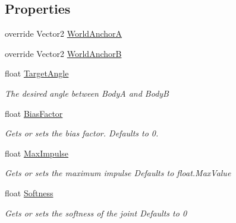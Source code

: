 \subsection*{Properties}
\begin{DoxyCompactItemize}
\item 
override Vector2 \hyperlink{class_farseer_physics_1_1_dynamics_1_1_joints_1_1_angle_joint_a746ea8907dc1b6603ebaa78c293d350b}{World\+Anchor\+A}
\item 
override Vector2 \hyperlink{class_farseer_physics_1_1_dynamics_1_1_joints_1_1_angle_joint_a5b13e62b4d20eee9f5d6e2aebc826d3d}{World\+Anchor\+B}
\item 
float \hyperlink{class_farseer_physics_1_1_dynamics_1_1_joints_1_1_angle_joint_ab71740c25d87b0a1f80804387f7c733d}{Target\+Angle}
\begin{DoxyCompactList}\small\item\em The desired angle between Body\+A and Body\+B \end{DoxyCompactList}\item 
float \hyperlink{class_farseer_physics_1_1_dynamics_1_1_joints_1_1_angle_joint_aa7cc30868103af9703678ad8f9c6eb20}{Bias\+Factor}
\begin{DoxyCompactList}\small\item\em Gets or sets the bias factor. Defaults to 0. \end{DoxyCompactList}\item 
float \hyperlink{class_farseer_physics_1_1_dynamics_1_1_joints_1_1_angle_joint_a0b78b8b3752ab65c78c926177fd661b6}{Max\+Impulse}
\begin{DoxyCompactList}\small\item\em Gets or sets the maximum impulse Defaults to float.\+Max\+Value \end{DoxyCompactList}\item 
float \hyperlink{class_farseer_physics_1_1_dynamics_1_1_joints_1_1_angle_joint_a27a6002baec2d2afa8e8ffdc506a8726}{Softness}
\begin{DoxyCompactList}\small\item\em Gets or sets the softness of the joint Defaults to 0 \end{DoxyCompactList}\end{DoxyCompactItemize}
